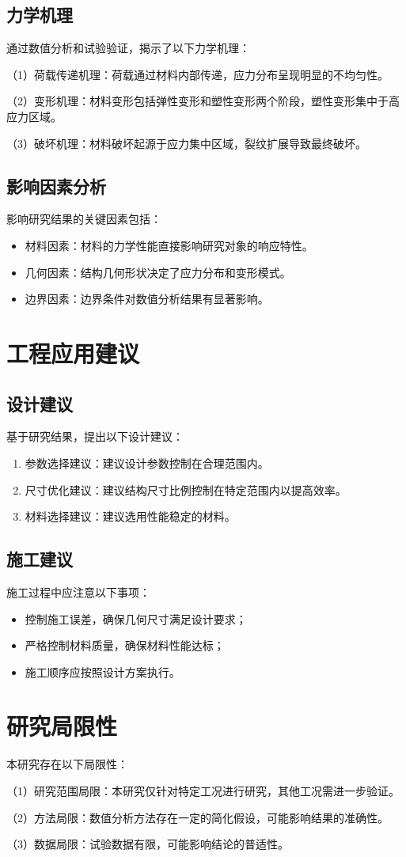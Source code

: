 \subsection{力学机理}
通过数值分析和试验验证，揭示了以下力学机理：

（1）荷载传递机理：荷载通过材料内部传递，应力分布呈现明显的不均匀性。

（2）变形机理：材料变形包括弹性变形和塑性变形两个阶段，塑性变形集中于高应力区域。

（3）破坏机理：材料破坏起源于应力集中区域，裂纹扩展导致最终破坏。

\subsection{影响因素分析}
影响研究结果的关键因素包括：
\begin{itemize}
    \item 材料因素：材料的力学性能直接影响研究对象的响应特性。
    \item 几何因素：结构几何形状决定了应力分布和变形模式。
    \item 边界因素：边界条件对数值分析结果有显著影响。
\end{itemize}

\section{工程应用建议}
\subsection{设计建议}
基于研究结果，提出以下设计建议：
\begin{enumerate}
    \item 参数选择建议：建议设计参数控制在合理范围内。
    \item 尺寸优化建议：建议结构尺寸比例控制在特定范围内以提高效率。
    \item 材料选择建议：建议选用性能稳定的材料。
\end{enumerate}

\subsection{施工建议}
施工过程中应注意以下事项：
\begin{itemize}
    \item 控制施工误差，确保几何尺寸满足设计要求；
    \item 严格控制材料质量，确保材料性能达标；
    \item 施工顺序应按照设计方案执行。
\end{itemize}

\section{研究局限性}
本研究存在以下局限性：

（1）研究范围局限：本研究仅针对特定工况进行研究，其他工况需进一步验证。

（2）方法局限：数值分析方法存在一定的简化假设，可能影响结果的准确性。

（3）数据局限：试验数据有限，可能影响结论的普适性。